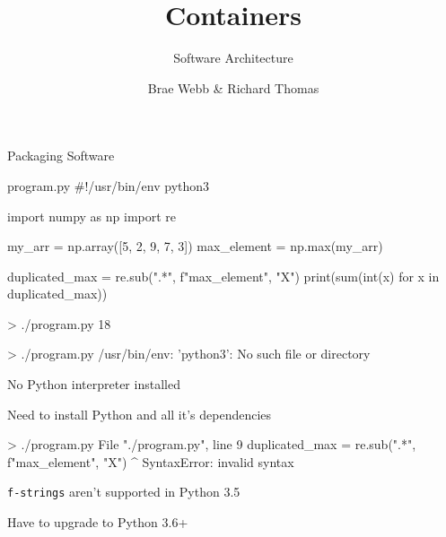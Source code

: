 \documentclass{slide}
\title{Containers}
\subtitle{Software Architecture}
\author{Brae Webb \& Richard Thomas}
\date{\week{3}}
\begin{document}
\maketitle



\begin{frame}[fragile]{Packaging Software}
    \vspace{-1em}
    \begin{code}[language=python]{program.py}
#!/usr/bin/env python3

import numpy as np
import re

my_arr = np.array([5, 2, 9, 7, 3])
max_element = np.max(my_arr)

duplicated_max = re.sub(".*", f"{max_element}", "X")
print(sum(int(x) for x in duplicated_max))
    \end{code}
    \begin{code}[numbers=none]{}
> ./program.py
18
    \end{code}
\end{frame}


\begin{frame}[fragile]
    \begin{code}[numbers=none]{}
> ./program.py
/usr/bin/env: 'python3': No such file or directory
    \end{code}
    \pause
    \large
    No Python interpreter installed
    
    Need to install Python and all it's dependencies
\end{frame}

\begin{frame}[fragile]
    \begin{code}[numbers=none]{}
> ./program.py
File "./program.py", line 9
    duplicated_max = re.sub(".*", f"{max_element}", "X")
                                                 ^
SyntaxError: invalid syntax
    \end{code}
    \pause
    \large
    \texttt{f-strings} aren't supported in Python 3.5
    
    Have to upgrade to Python 3.6+
\end{frame}
\end{document}
